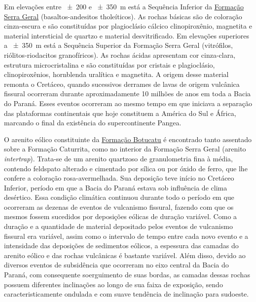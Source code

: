 Em elevações entre \num{\pm200} e \SI{\pm350}{\metre} está a Sequência Inferior da 
\href{http://pt.wikipedia.org/wiki/Forma\%C3\%A7\%C3\%A3o_Serra_Geral}{Formação Serra Geral} 
(basaltos-andesitos tholeíticos). As rochas básicas são de coloração cinza-escura e são constituídas
por plagioclásio cálcico clinopiroxênio, magnetita e material intersticial de quartzo e material 
desvitrificado. Em elevações superiores a \SI{\pm350}{\metre} está a Sequência Superior da Formação 
Serra Geral (vitrófilos, riólitos-riodacitos granofíricos). As rochas ácidas apresentam cor 
cinza-clara, estrutura microcristalina e são constituídas por cristais e plagioclásio, 
clinopiroxênios, hornblenda uralítica e magnetita. A origem desse material remonta o Cretáceo, 
quando sucessivos derrames de lavas de origem vulcânica fissural ocorreram durante aproximadamente 
10 milhões de anos em toda a Bacia do Paraná. Esses eventos ocorreram ao mesmo tempo em que iniciava
a separação das plataformas continentais que hoje constituem a América do Sul e África, marcando o 
final da existência do supercontinente Pangea.

O arenito eólico constituinte da 
\href{http://pt.wikipedia.org/wiki/Forma\%C3\%A7\%C3\%A3o_Botucatu}{Formação Botucatu} é encontrado 
tanto assentado sobre a Formação Caturrita, como no interior da Formação Serra Geral (arenito 
\textit{intertrap}). Trata-se de um arenito quartzoso de granulometria fina à média, contendo 
feldspato alterado e cimentado por sílica ou por óxido de ferro, que lhe confere a coloração 
rosa-avermelhada. Sua deposição teve início no Cretáceo Inferior, período em que a Bacia do Paraná 
estava sob influência de clima desértico. Essa condição climática continuou durante todo o período 
em que ocorreram as dezenas de eventos de vulcanismo fissural, fazendo com que os mesmos fossem 
sucedidos por deposições eólicas de duração variável. Como a duração e a quantidade de material 
depositado pelos eventos de vulcanismo fissural era variável, assim como o intervalo de tempo entre 
cada novo evento e a intensidade das deposições de sedimentos eólicos, a espessura das camadas do 
arenito eólico e das rochas vulcânicas é bastante variável. Além disso, devido ao diversos eventos 
de subsidência que ocorreram no eixo central da Bacia do Paraná, com consequente soerguimento de 
suas bordas, as camadas dessas rochas possuem diferentes inclinações ao longo de sua faixa de 
exposição, sendo caracteristicamente ondulada e com suave tendência de inclinação para sudoeste.

